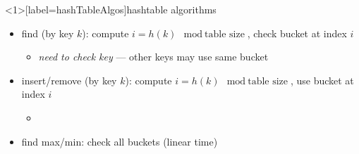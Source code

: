 \begin{frame}<1>[label=hashTableAlgos]{hashtable algorithms}
\begin{itemize}
\item find (by key $k$): compute $i = h(k) \mod \text{table size}$, check bucket at index $i$
\begin{itemize}
\item \textit{need to check key} --- other keys may use same bucket
\end{itemize}
\item insert/remove (by key $k$): compute $i = h(k) \mod \text{table size}$, use bucket at index $i$
\begin{itemize}
\item {}
\end{itemize}
\item find max/min: check all buckets (linear time)
\end{itemize}
\end{frame}
